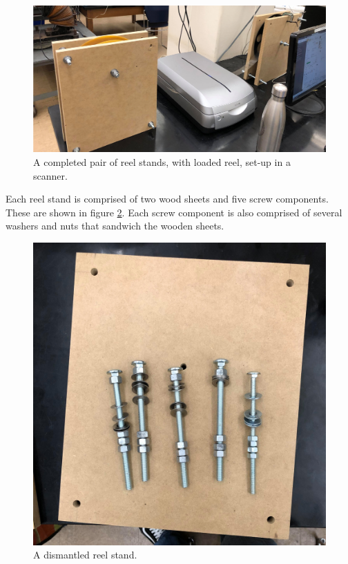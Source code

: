 \documentclass[12pt]{article} %
\begin{document}
\begin{figure}[htb]
    \centering
    \includegraphics[width=0.7\linewidth]{Images/Reel stand images/reelstandaction.jpg}
    \caption{A completed pair of reel stands, with loaded reel, set-up in a scanner.}
    \label{fig: reelsstandsinaction}
\end{figure}

Each reel stand is comprised of two wood sheets and five screw components. These are shown in figure \ref{fig: reelstanddismantled}. Each screw component is also comprised of several washers and nuts that sandwich the wooden sheets.
\begin{figure}[H]
    \centering
    \includegraphics[width=0.7\linewidth]{Images/Reel stand images/reelstanddismantled.jpg}
    \caption{A dismantled reel stand.}
    \label{fig: reelstanddismantled}
\end{figure}
\end{document}
